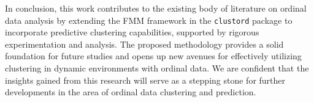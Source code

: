 \documentclass{article}
\begin{document}
In conclusion, this work contributes to the existing body of literature on ordinal data analysis by extending the FMM framework in the \texttt{clustord} package to incorporate predictive clustering capabilities, supported by rigorous experimentation and analysis. The proposed methodology provides a solid foundation for future studies and opens up new avenues for effectively utilizing clustering in dynamic environments with ordinal data. We are confident that the insights gained from this research will serve as a stepping stone for further developments in the area of ordinal data clustering and prediction.


\printbibliography
\end{document}
